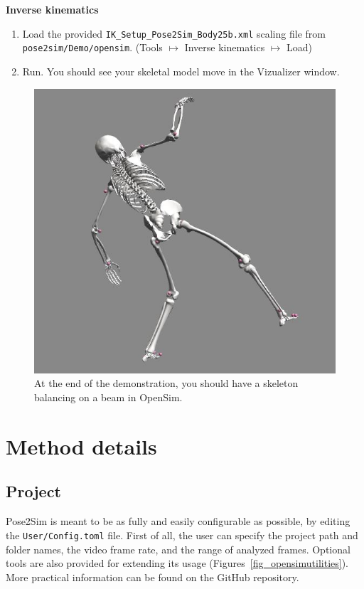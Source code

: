 \textbf{Inverse kinematics}
\begin{enumerate}[itemsep=0em, topsep=0em, leftmargin=*]
    \item Load the provided \texttt{IK_Setup_Pose2Sim_Body25b.xml} scaling file from \texttt{pose2sim/Demo/opensim}. (Tools $\mapsto$ Inverse kinematics $\mapsto$ Load)
    \item Run. You should see your skeletal model move in the Vizualizer window.
\end{enumerate}

\begin{figure}[hbtp]
	\centering
	\def\svgwidth{1\columnwidth}
	\fontsize{10pt}{10pt}\selectfont
	\includegraphics[width=\linewidth]{"../Chap3/Figures/OpenSimDemo.JPG"}
	\caption{At the end of the demonstration, you should have a skeleton balancing on a beam in OpenSim.}
	\label{fig_opensimdemo}
\end{figure}


\section{Method details}

\subsection{Project}
Pose2Sim is meant to be as fully and easily configurable as possible, by editing the \texttt{User/Config.toml} file. First of all, the user can specify the project path and folder names, the video frame rate, and the range of analyzed frames. Optional tools are also provided for extending its usage (Figures~\ref{fig_opensimutilities}). More practical information can be found on the GitHub repository. 

